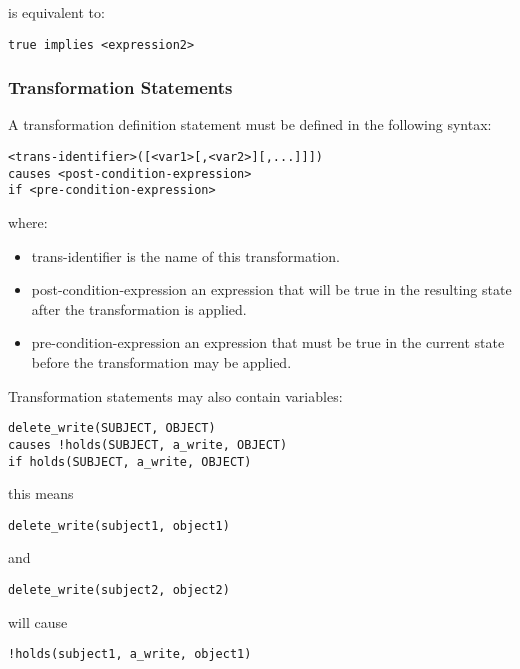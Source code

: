 \documentclass[a4paper]{article}
\begin{document}
        is equivalent to:

\begin{verbatim}
true implies <expression2>
\end{verbatim}

      \subsubsection{Transformation Statements}

        A transformation definition statement must be defined in the following
        syntax:

\begin{verbatim}
<trans-identifier>([<var1>[,<var2>][,...]]])
causes <post-condition-expression>
if <pre-condition-expression>
\end{verbatim}

        where:

        \begin{itemize}
          \item
            trans-identifier is the name of this transformation.
          \item
            post-condition-expression an expression that will be true in the
            resulting state after the transformation is applied.
          \item
            pre-condition-expression an expression that must be true in the
            current state before the transformation may be applied.
        \end{itemize}


        Transformation statements may also contain variables:

\begin{verbatim}
delete_write(SUBJECT, OBJECT)
causes !holds(SUBJECT, a_write, OBJECT)
if holds(SUBJECT, a_write, OBJECT)
\end{verbatim}
        this means

\begin{verbatim}
delete_write(subject1, object1)
\end{verbatim}

        and

\begin{verbatim}
delete_write(subject2, object2)
\end{verbatim}

        will cause

\begin{verbatim}
!holds(subject1, a_write, object1)
\end{verbatim}
\end{document}
